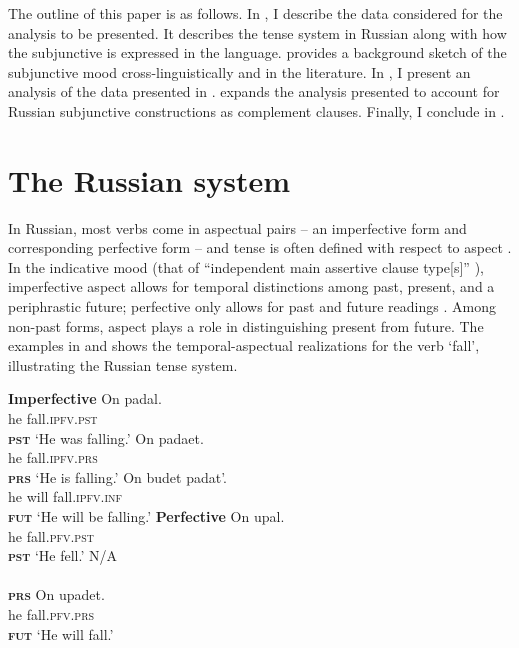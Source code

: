 \documentclass[output=paper,
modfonts,
newtxmath,
hidelinks,
]{langscibook}
\begin{document}
The outline of this paper is as follows. In , I describe the data considered for the analysis to be presented. It describes the tense system in Russian along with how the subjunctive is expressed in the language.  provides a background sketch of the subjunctive mood cross-linguistically and in the literature. In , I present an analysis of the data presented in .  expands the analysis presented to account for Russian subjunctive constructions as complement clauses. Finally, I conclude in . 

\section{The Russian system}\label{s2}

In Russian, most verbs come in aspectual pairs \citep[371]{Mezhevich2008} – an imperfective form and corresponding perfective form – and tense is often defined with respect to aspect \citep[373]{Mezhevich2008}. In the indicative mood (that of “independent main assertive clause type[s]” \citep[1]{Wiltschko}), imperfective aspect allows for temporal distinctions among past, present, and a periphrastic future; perfective only allows for past and future readings \citep[371]{Mezhevich2008}. Among non-past forms, aspect plays a role in distinguishing present from future. The examples in  and  shows the temporal-aspectual realizations for the verb ‘fall’, illustrating the Russian tense system.

\begin{multicols}{2}
\ea \textbf{Imperfective}\label{ex:ipfv}
\ea\gll On padal.\\
he fall.\textsc{ipfv.pst}\\\hfill\textsc{\textbf{pst}}
\glt `He was falling.'
\ex\gll On padaet.\\
he fall.\textsc{ipfv.prs}\\\hfill\textsc{\textbf{prs}}
\glt `He is falling.'
\ex\gll On budet padat'.\\
he will fall.\textsc{ipfv.inf}\\\hfill\textsc{\textbf{fut}}
\glt `He will be falling.'
\z\z\columnbreak
\ea \textbf{Perfective}\label{ex:pfv}
\ea\gll On upal.\\
he fall.\textsc{pfv.pst}\\\hfill\textsc{\textbf{pst}}
\glt `He fell.'
\ex\gll N/A\\
{}\\\hfill\textsc{\textbf{prs}}
\glt {}\vspace{14pt}
\ex\gll On upadet.\\
he fall.\textsc{pfv.prs}\\\hfill\textsc{\textbf{fut}}
\glt `He will fall.'
\z\z

\end{multicols}
\end{document}
